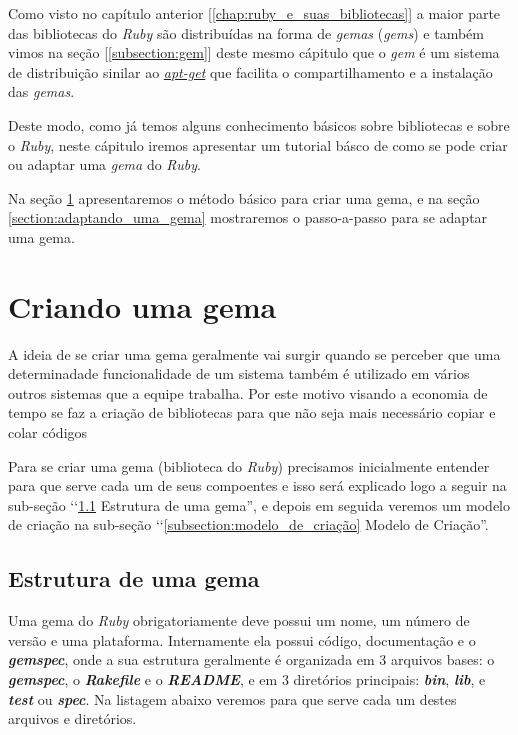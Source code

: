 Como visto no capítulo anterior [\ref{chap:ruby_e_suas_bibliotecas}] a maior parte das bibliotecas do 
\emph{Ruby} são distribuídas na forma de \emph{gemas} (\emph{gems}) e também vimos na seção 
[\ref{subsection:gem}] deste mesmo cápitulo que o \emph{gem} é um sistema de distribuição sinilar ao 
\emph{\href{https://packages.qa.debian.org/a/apt.html}{apt-get}} que facilita o compartilhamento e a 
instalação das \emph{gemas}. 

Deste modo, como já temos alguns conhecimento básicos sobre bibliotecas e sobre o \emph{Ruby}, neste cápitulo 
iremos apresentar um tutorial básco de como se pode criar ou adaptar uma \emph{gema} do \emph{Ruby}.

Na seção \ref{section:criando_uma_gema} apresentaremos o método básico para criar uma gema, e na
seção \ref{section:adaptando_uma_gema} mostraremos o passo-a-passo para se adaptar uma gema.

\section{Criando uma gema}
\label{section:criando_uma_gema}

A ideia de se criar uma gema geralmente vai surgir quando se perceber que uma determinadade funcionalidade de
um sistema também é utilizado em vários outros sistemas que a equipe trabalha. Por este motivo visando a economia
de tempo se faz a criação de bibliotecas para que não seja mais necessário copiar e colar códigos 

Para se criar uma gema (biblioteca do \emph{Ruby}) precisamos inicialmente entender para que serve cada um
de seus compoentes e isso será explicado logo a seguir na sub-seção 
‘‘\ref{subsec:estrutura_de_uma_gema} Estrutura de uma gema'', e depois em seguida veremos um modelo de criação 
na sub-seção ‘‘\ref{subsection:modelo_de_criação} Modelo de Criação''.

\subsection{Estrutura de uma gema}
\label{subsec:estrutura_de_uma_gema}

Uma gema do \emph{Ruby} obrigatoriamente deve possui um nome, um número de versão e uma plataforma.
Internamente ela possui código, documentação e o \emph{\textbf{gemspec}}, onde a sua estrutura geralmente é 
organizada em 3 arquivos bases: o \emph{\textbf{gemspec}}, o \emph{\textbf{Rakefile}} e o 
\emph{\textbf{README}}, e em 3 diretórios principais: \emph{\textbf{bin}}, \emph{\textbf{lib}}, e 
\emph{\textbf{test}} ou \emph{\textbf{spec}}. Na listagem abaixo veremos para que serve cada um destes
arquivos e diretórios.


